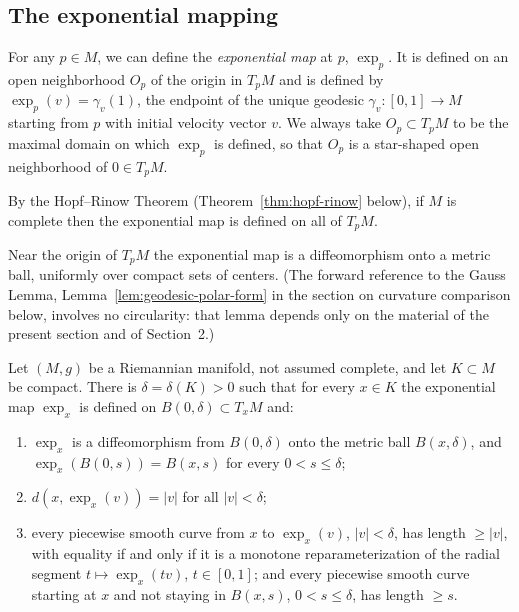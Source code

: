 \subsection{The exponential mapping}


\begin{definition}
\label{def:exponential-map}
\leanok
For any $p\in M$, we can define the \textit{exponential
map} at $p$, $\exp_{p}$. It is
defined on an open neighborhood $O_{p}$ of the origin in $T_{p}M$
and is defined by $\exp_{p}(v)=\gamma_v(1)$, the endpoint of
the unique geodesic $\gamma_v\colon [0,1]\rightarrow M$ starting
from $p$ with initial velocity vector $v$. We always take
$O_{p}\subset T_{p}M$ to be the maximal domain on which $\exp_p$ is defined, so that $O_{p}$ is a star-shaped open
neighborhood of $0\in T_pM$.
\end{definition}

By the Hopf--Rinow Theorem (Theorem~\ref{thm:hopf-rinow} below),
if $M$ is complete then the exponential map is defined on all of
$T_pM$.

Near the origin of $T_pM$ the exponential map is a diffeomorphism
onto a metric ball, uniformly over compact sets of centers. (The
forward reference to the Gauss Lemma,
Lemma~\ref{lem:geodesic-polar-form} in the section on curvature
comparison below, involves no circularity: that lemma depends only
on the material of the present section and of
Section~2.)

\begin{lemma}
\label{lem:normal-ball}
Let $(M,g)$ be a Riemannian manifold, not assumed complete, and let
$K\subset M$ be compact. There is $\delta=\delta(K)>0$ such that
for every $x\in K$ the exponential map $\exp_x$ is defined on
$B(0,\delta)\subset T_xM$ and:
\begin{enumerate}
\item $\exp_x$ is a diffeomorphism from $B(0,\delta)$ onto the
metric ball $B(x,\delta)$, and $\exp_x(B(0,s))=B(x,s)$ for every
$0<s\le\delta$;
\item $d(x,\exp_x(v))=|v|$ for all $|v|<\delta$;
\item every piecewise smooth curve from $x$ to $\exp_x(v)$,
$|v|<\delta$, has length $\ge|v|$, with equality if and only if it
is a monotone reparameterization of the radial segment
$t\mapsto\exp_x(tv)$, $t\in[0,1]$; and every piecewise smooth
curve starting at $x$ and not staying in $B(x,s)$, $0<s\le\delta$,
has length $\ge s$.
\end{enumerate}
\end{lemma}

